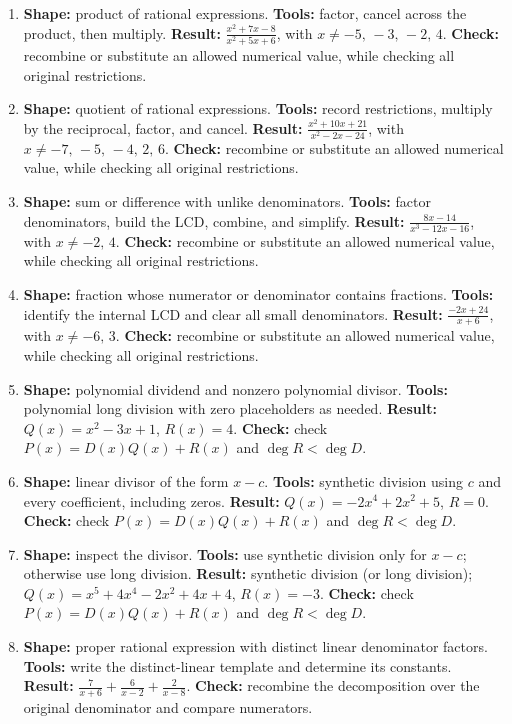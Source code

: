 \documentclass[11pt,oneside]{book}
\begin{document}
\begin{enumerate}[leftmargin=*,label=\textbf{CAP\arabic*.},itemsep=0.45\baselineskip]
\item \textbf{Shape:} product of rational expressions. \textbf{Tools:} factor, cancel across the product, then multiply. \textbf{Result:} $\displaystyle \frac{x^{2} + 7 x - 8}{x^{2} + 5 x + 6}$, with $x\ne -5,\,-3,\,-2,\,4$. \textbf{Check:} recombine or substitute an allowed numerical value, while checking all original restrictions.
\item \textbf{Shape:} quotient of rational expressions. \textbf{Tools:} record restrictions, multiply by the reciprocal, factor, and cancel. \textbf{Result:} $\displaystyle \frac{x^{2} + 10 x + 21}{x^{2} - 2 x - 24}$, with $x\ne -7,\,-5,\,-4,\,2,\,6$. \textbf{Check:} recombine or substitute an allowed numerical value, while checking all original restrictions.
\item \textbf{Shape:} sum or difference with unlike denominators. \textbf{Tools:} factor denominators, build the LCD, combine, and simplify. \textbf{Result:} $\displaystyle \frac{8 x - 14}{x^{3} - 12 x - 16}$, with $x\ne -2,\,4$. \textbf{Check:} recombine or substitute an allowed numerical value, while checking all original restrictions.
\item \textbf{Shape:} fraction whose numerator or denominator contains fractions. \textbf{Tools:} identify the internal LCD and clear all small denominators. \textbf{Result:} $\displaystyle \frac{- 2 x + 24}{x + 6}$, with $x\ne -6,\,3$. \textbf{Check:} recombine or substitute an allowed numerical value, while checking all original restrictions.
\item \textbf{Shape:} polynomial dividend and nonzero polynomial divisor. \textbf{Tools:} polynomial long division with zero placeholders as needed. \textbf{Result:} $Q(x)=x^{2} - 3 x + 1$, $R(x)=4$. \textbf{Check:} check $P(x)=D(x)Q(x)+R(x)$ and $\deg R<\deg D$.
\item \textbf{Shape:} linear divisor of the form $x-c$. \textbf{Tools:} synthetic division using $c$ and every coefficient, including zeros. \textbf{Result:} $Q(x)=- 2 x^{4} + 2 x^{2} + 5$, $R=0$. \textbf{Check:} check $P(x)=D(x)Q(x)+R(x)$ and $\deg R<\deg D$.
\item \textbf{Shape:} inspect the divisor. \textbf{Tools:} use synthetic division only for $x-c$; otherwise use long division. \textbf{Result:} synthetic division (or long division); $Q(x)=x^{5} + 4 x^{4} - 2 x^{2} + 4 x + 4$, $R(x)=-3$. \textbf{Check:} check $P(x)=D(x)Q(x)+R(x)$ and $\deg R<\deg D$.
\item \textbf{Shape:} proper rational expression with distinct linear denominator factors. \textbf{Tools:} write the distinct-linear template and determine its constants. \textbf{Result:} $\displaystyle \frac{7}{x + 6} + \frac{6}{x - 2} + \frac{2}{x - 8}$. \textbf{Check:} recombine the decomposition over the original denominator and compare numerators.

\end{enumerate}
\end{document}
